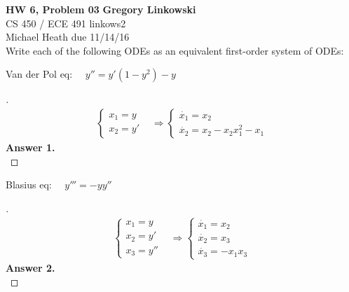 \documentclass[12pt]{article}
\newenvironment{exercise}[2][Exercise]{\begin{trivlist}
\item[\hskip \labelsep {\bfseries #1}\hskip \labelsep {\bfseries #2.}]}{\end{trivlist}}
\begin{document}
\noindent
\large\textbf{HW 6, Problem 03} \hfill \textbf{Gregory Linkowski} \\
\normalsize CS 450 / ECE 491 \hfill linkows2 \\
Michael Heath \hfill due 11/14/16 \\


\vspace{5mm}
Write each of the following ODEs as an equivalent first-order system of ODEs:
\vspace{-2mm} \\

\begin{exercise}{1}
	Van der Pol eq: $\quad y'' = y'(1-y^2) - y$
\end{exercise} \vspace{-10mm}
\begin{proof}[]
	\begin{align*}
		\begin{cases} x_1 = y \\ x_2 = y' \end{cases}
		& \Rightarrow \begin{cases}
			\dot{x_1} = x_2 \\
			\dot{x_2} = x_2 - x_2 x_1^2 - x_1
		\end{cases}
	\end{align*}
	\textbf{Answer 1.} \vspace{-7mm} \\
		\[ \boxed{  } \]
\end{proof}

\begin{exercise}{2}
	Blasius eq: $\quad y'''  = -y y''$
\end{exercise} \vspace{-10mm}
\begin{proof}[]
	\begin{align*}
	\begin{cases} x_1 = y \\ x_2 = y' \\ x_3 = y'' \end{cases}
	& \Rightarrow \begin{cases}
	\dot{x_1} = x_2 \\
	\dot{x_2} = x_3 \\
	\dot{x_3} = - x_1 x_3
	\end{cases}
	\end{align*}
	\textbf{Answer 2.} \vspace{-7mm} \\
	\[ \boxed{  } \]
\end{proof}
\end{document}

